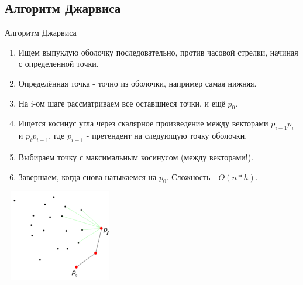 \documentclass[10pt]{beamer}
\begin{document}
\subsection{Алгоритм Джарвиса}
\begin{frame}[fragile]{Алгоритм Джарвиса}
\begin{enumerate}
\item Ищем выпуклую оболочку последовательно, против часовой стрелки, начиная с определенной точки.
\item Определённая точка - точно из оболочки, например самая нижняя.
\item На i-ом шаге рассматриваем все оставшиеся точки, и ещё $p_0$.
\item Ищется косинус угла через скалярное произведение между векторами $p_{i-1} p_i$ и $p_i p_{i+1}$, где $p_{i+1}$ - претендент на следующую точку оболочки.
\item Выбираем точку с максимальным косинусом (между векторами!).
\item Завершаем, когда снова натыкаемся на $p_0$. Сложность - $O(n*h)$.
\end{enumerate}
\begin{center}
\includegraphics[width=5cm, height=4cm]{Term_3/Source/Pictures//jarvis.png}
\end{center}
\end{frame}
\end{document}
